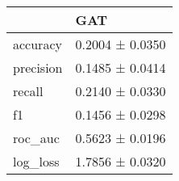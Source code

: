 \begin{tabular}{ll}
\toprule
 & GAT \\
\midrule
accuracy & 0.2004 ± 0.0350 \\
precision & 0.1485 ± 0.0414 \\
recall & 0.2140 ± 0.0330 \\
f1 & 0.1456 ± 0.0298 \\
roc_auc & 0.5623 ± 0.0196 \\
log_loss & 1.7856 ± 0.0320 \\
\bottomrule
\end{tabular}
